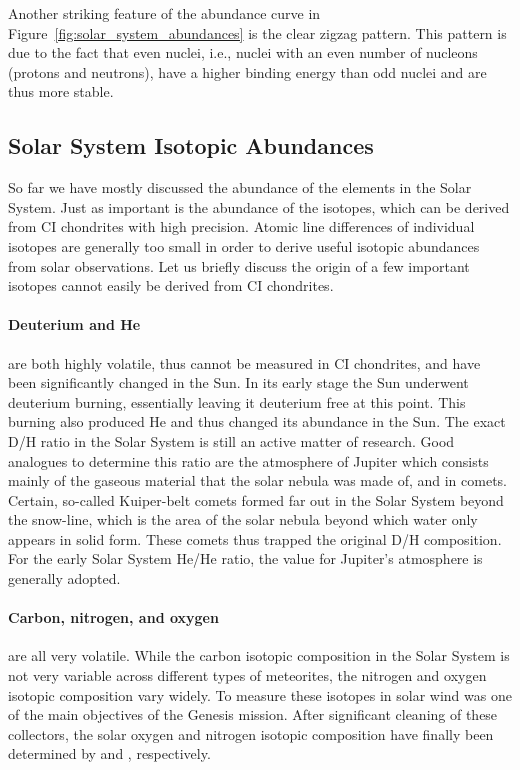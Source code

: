 Another striking feature of the abundance curve in Figure~\ref{fig:solar_system_abundances} is the clear zigzag pattern. This pattern is due to the fact that even nuclei, i.e., nuclei with an even number of nucleons (protons and neutrons), have a higher binding energy than odd nuclei and are thus more stable. 


\subsection{Solar System Isotopic Abundances}

So far we have mostly discussed the abundance of the elements in the Solar System. Just as important is the abundance of the isotopes, which can be derived from CI chondrites with high precision. Atomic line differences of individual isotopes are generally too small in order to derive useful isotopic abundances from solar observations. Let us briefly discuss the origin of a few important isotopes cannot easily be derived from CI chondrites.

\paragraph{Deuterium and He} are both highly volatile, thus cannot be measured in CI chondrites, and have been significantly changed in the Sun. In its early stage the Sun underwent deuterium burning, essentially leaving it deuterium free at this point. This burning also produced He and thus changed its abundance in the Sun. The exact D/H ratio in the Solar System is still an active matter of research. Good analogues to determine this ratio are the atmosphere of Jupiter which consists mainly of the gaseous material that the solar nebula was made of, and in comets. Certain, so-called Kuiper-belt comets formed far out in the Solar System beyond the snow-line, which is the area of the solar nebula beyond which water only appears in solid form. These comets thus trapped the original D/H composition. For the early Solar System He/He ratio, the value for Jupiter's atmosphere is generally adopted.

\paragraph{Carbon, nitrogen, and oxygen} are all very volatile. While the carbon isotopic composition in the Solar System is not very variable across different types of meteorites, the nitrogen and oxygen isotopic composition vary widely. To measure these isotopes in solar wind was one of the main objectives of the Genesis mission. After significant cleaning of these collectors, the solar oxygen and nitrogen isotopic composition have finally been determined by \citet{mckeegan11} and \citet{marty11}, respectively.

